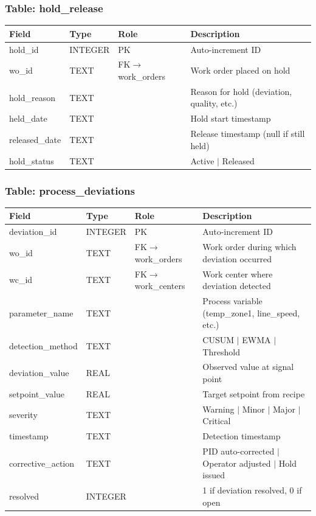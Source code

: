 \documentclass[11pt]{article}
\begin{document}
\subsubsection*{Table: hold\_release}
\begin{table}[H]\centering\small
\begin{tabular}{@{} l l l L{5.5cm} @{}}
\toprule
\textbf{Field} & \textbf{Type} & \textbf{Role} & \textbf{Description} \\
\midrule
hold\_id       & INTEGER & PK  & Auto-increment ID \\
wo\_id         & TEXT    & FK$\to$work\_orders & Work order placed on hold \\
hold\_reason   & TEXT    &     & Reason for hold (deviation, quality, etc.) \\
held\_date     & TEXT    &     & Hold start timestamp \\
released\_date & TEXT    &     & Release timestamp (null if still held) \\
hold\_status   & TEXT    &     & Active $\mid$ Released \\
\bottomrule
\end{tabular}
\end{table}

\subsubsection*{Table: process\_deviations}
\begin{table}[H]\centering\small
\begin{tabular}{@{} l l l L{5.0cm} @{}}
\toprule
\textbf{Field} & \textbf{Type} & \textbf{Role} & \textbf{Description} \\
\midrule
deviation\_id    & INTEGER & PK  & Auto-increment ID \\
wo\_id           & TEXT    & FK$\to$work\_orders & Work order during which deviation occurred \\
wc\_id           & TEXT    & FK$\to$work\_centers & Work center where deviation detected \\
parameter\_name  & TEXT    &     & Process variable (temp\_zone1, line\_speed, etc.) \\
detection\_method & TEXT   &     & CUSUM $\mid$ EWMA $\mid$ Threshold \\
deviation\_value & REAL    &     & Observed value at signal point \\
setpoint\_value  & REAL    &     & Target setpoint from recipe \\
severity         & TEXT    &     & Warning $\mid$ Minor $\mid$ Major $\mid$ Critical \\
timestamp        & TEXT    &     & Detection timestamp \\
corrective\_action & TEXT  &     & PID auto-corrected $\mid$ Operator adjusted $\mid$ Hold issued \\
resolved         & INTEGER &    & 1 if deviation resolved, 0 if open \\
\bottomrule
\end{tabular}
\end{table}
\end{document}
